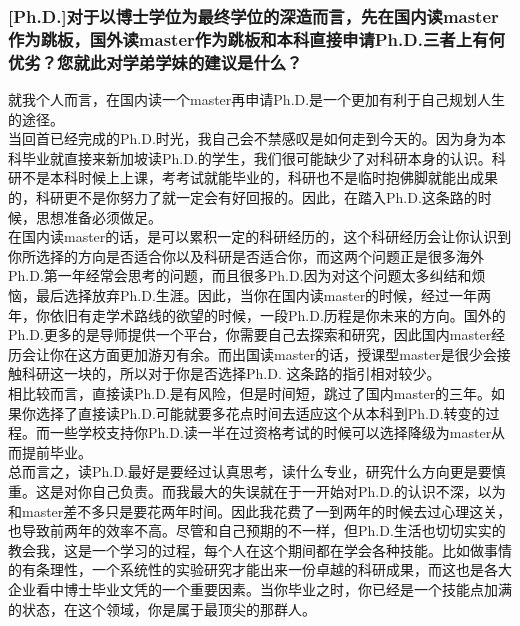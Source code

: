 \documentclass[a4paper,UTF8]{book}
\begin{document}
    \subsubsection*{[Ph.D.]对于以博士学位为最终学位的深造而言，先在国内读master作为跳板，国外读master作为跳板和本科直接申请Ph.D.三者上有何优劣？您就此对学弟学妹的建议是什么？}
    就我个人而言，在国内读一个master再申请Ph.D.是一个更加有利于自己规划人生的途径。  \\
    当回首已经完成的Ph.D.时光，我自己会不禁感叹是如何走到今天的。因为身为本科毕业就直接来新加坡读Ph.D.的学生，我们很可能缺少了对科研本身的认识。科研不是本科时候上上课，考考试就能毕业的，科研也不是临时抱佛脚就能出成果的，科研更不是你努力了就一定会有好回报的。因此，在踏入Ph.D.这条路的时候，思想准备必须做足。\\
    在国内读master的话，是可以累积一定的科研经历的，这个科研经历会让你认识到你所选择的方向是否适合你以及科研是否适合你，而这两个问题正是很多海外Ph.D.第一年经常会思考的问题，而且很多Ph.D.因为对这个问题太多纠结和烦恼，最后选择放弃Ph.D.生涯。因此，当你在国内读master的时候，经过一年两年，你依旧有走学术路线的欲望的时候，一段Ph.D.历程是你未来的方向。国外的Ph.D.更多的是导师提供一个平台，你需要自己去探索和研究，因此国内master经历会让你在这方面更加游刃有余。而出国读master的话，授课型master是很少会接触科研这一块的，所以对于你是否选择Ph.D. 这条路的指引相对较少。\\
    相比较而言，直接读Ph.D.是有风险，但是时间短，跳过了国内master的三年。如果你选择了直接读Ph.D.可能就要多花点时间去适应这个从本科到Ph.D.转变的过程。而一些学校支持你Ph.D.读一半在过资格考试的时候可以选择降级为master从而提前毕业。\\
    总而言之，读Ph.D.最好是要经过认真思考，读什么专业，研究什么方向更是要慎重。这是对你自己负责。而我最大的失误就在于一开始对Ph.D.的认识不深，以为和master差不多只是要花两年时间。因此我花费了一到两年的时候去过心理这关，也导致前两年的效率不高。尽管和自己预期的不一样，但Ph.D.生活也切切实实的教会我，这是一个学习的过程，每个人在这个期间都在学会各种技能。比如做事情的有条理性，一个系统性的实验研究才能出来一份卓越的科研成果，而这也是各大企业看中博士毕业文凭的一个重要因素。当你毕业之时，你已经是一个技能点加满的状态，在这个领域，你是属于最顶尖的那群人。
\end{document}
